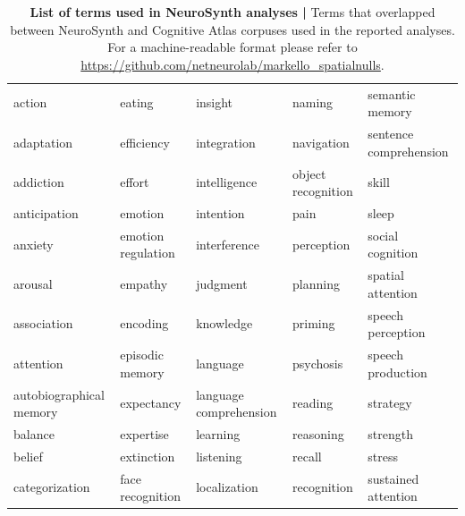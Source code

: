 \documentclass[12pt,aps,pra,reprint,showkeys]{revtex4-1}
\begin{document}
\begin{table}[htp]
    \caption{
      \textbf{List of terms used in NeuroSynth analyses | }
      Terms that overlapped between NeuroSynth \citep{yarkoni2011natmethods} and Cognitive Atlas \citep{poldrack2011frontiers} corpuses used in the reported analyses.
      For a machine-readable format please refer to \url{https://github.com/netneurolab/markello_spatialnulls}.
    }
    \label{supp-table-ns-terms}
    \setlength{\tabcolsep}{4.5pt}
    \renewcommand{\arraystretch}{1.1}
    \begin{center}
      \begin{tabular}{l l l l l}
        action                  & eating             & insight                & naming                 & semantic memory        \\
        adaptation              & efficiency         & integration            & navigation             & sentence comprehension \\
        addiction               & effort             & intelligence           & object recognition     & skill                  \\
        anticipation            & emotion            & intention              & pain                   & sleep                  \\
        anxiety                 & emotion regulation & interference           & perception             & social cognition       \\
        arousal                 & empathy            & judgment               & planning               & spatial attention      \\
        association             & encoding           & knowledge              & priming                & speech perception      \\
        attention               & episodic memory    & language               & psychosis              & speech production      \\
        autobiographical memory & expectancy         & language comprehension & reading                & strategy               \\
        balance                 & expertise          & learning               & reasoning              & strength               \\
        belief                  & extinction         & listening              & recall                 & stress                 \\
        categorization          & face recognition   & localization           & recognition            & sustained attention    \\

\end{tabular}
\end{center}
\end{table}
\end{document}

